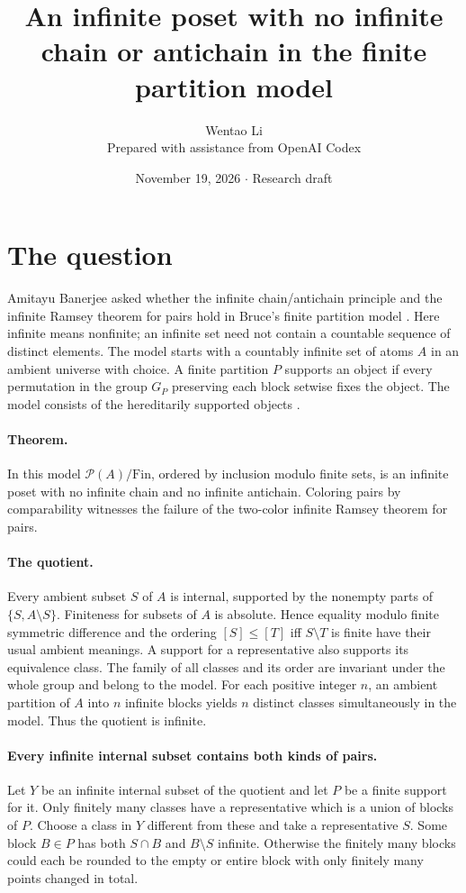 \documentclass[11pt]{article}
\title{An infinite poset with no infinite chain or antichain in the finite partition model}
\author{Wentao Li\\{\small Prepared with assistance from OpenAI Codex}}
\date{November 19, 2026 \quad $\cdot$ \quad Research draft}
\begin{document}
\maketitle
\section*{The question}
Amitayu Banerjee asked whether the infinite chain/antichain principle and the infinite Ramsey theorem for pairs hold in Bruce's finite partition model \cite{ban}. Here infinite means nonfinite; an infinite set need not contain a countable sequence of distinct elements. The model starts with a countably infinite set of atoms $A$ in an ambient universe with choice. A finite partition $P$ supports an object if every permutation in the group $G_P$ preserving each block setwise fixes the object. The model consists of the hereditarily supported objects \cite{bruce}.

\paragraph{Theorem.} In this model $\mathcal P(A)/\mathrm{Fin}$, ordered by inclusion modulo finite sets, is an infinite poset with no infinite chain and no infinite antichain. Coloring pairs by comparability witnesses the failure of the two-color infinite Ramsey theorem for pairs.

\paragraph{The quotient.} Every ambient subset $S$ of $A$ is internal, supported by the nonempty parts of $\{S,A\setminus S\}$. Finiteness for subsets of $A$ is absolute. Hence equality modulo finite symmetric difference and the ordering $[S]\le[T]$ iff $S\setminus T$ is finite have their usual ambient meanings. A support for a representative also supports its equivalence class. The family of all classes and its order are invariant under the whole group and belong to the model. For each positive integer $n$, an ambient partition of $A$ into $n$ infinite blocks yields $n$ distinct classes simultaneously in the model. Thus the quotient is infinite.

\paragraph{Every infinite internal subset contains both kinds of pairs.} Let $Y$ be an infinite internal subset of the quotient and let $P$ be a finite support for it. Only finitely many classes have a representative which is a union of blocks of $P$. Choose a class in $Y$ different from these and take a representative $S$. Some block $B\in P$ has both $S\cap B$ and $B\setminus S$ infinite. Otherwise the finitely many blocks could each be rounded to the empty or entire block with only finitely many points changed in total.
\end{document}
